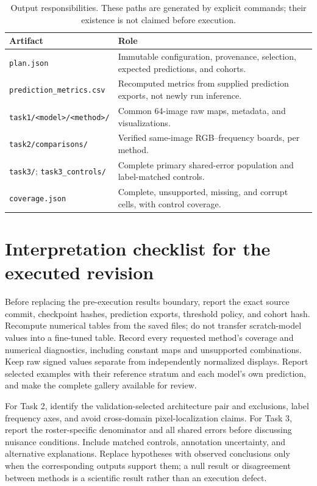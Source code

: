 \documentclass{article}
\begin{document}
\begin{table}[h]
\caption{Output responsibilities. These paths are generated by explicit commands; their existence is not claimed before execution.}
\centering\small
\begin{tabular}{p{.40\linewidth}p{.52\linewidth}}
\toprule
Artifact & Role\\
\midrule
\texttt{plan.json} & Immutable configuration, provenance, selection, expected predictions, and cohorts.\\
\texttt{prediction\_metrics.csv} & Recomputed metrics from supplied prediction exports, not newly run inference.\\
\texttt{task1/<model>/<method>/} & Common 64-image raw maps, metadata, and visualizations.\\
\texttt{task2/comparisons/} & Verified same-image RGB--frequency boards, per method.\\
\texttt{task3/}; \texttt{task3\_controls/} & Complete primary shared-error population and label-matched controls.\\
\texttt{coverage.json} & Complete, unsupported, missing, and corrupt cells, with control coverage.\\
\bottomrule
\end{tabular}
\end{table}

\section{Interpretation checklist for the executed revision}
Before replacing the pre-execution results boundary, report the exact source commit, checkpoint hashes, prediction exports, threshold policy, and cohort hash. Recompute numerical tables from the saved files; do not transfer scratch-model values into a fine-tuned table. Record every requested method's coverage and numerical diagnostics, including constant maps and unsupported combinations. Keep raw signed values separate from independently normalized displays. Report selected examples with their reference stratum and each model's own prediction, and make the complete gallery available for review.

For Task 2, identify the validation-selected architecture pair and exclusions, label frequency axes, and avoid cross-domain pixel-localization claims. For Task 3, report the roster-specific denominator and all shared errors before discussing nuisance conditions. Include matched controls, annotation uncertainty, and alternative explanations. Replace hypotheses with observed conclusions only when the corresponding outputs support them; a null result or disagreement between methods is a scientific result rather than an execution defect.
\end{document}
